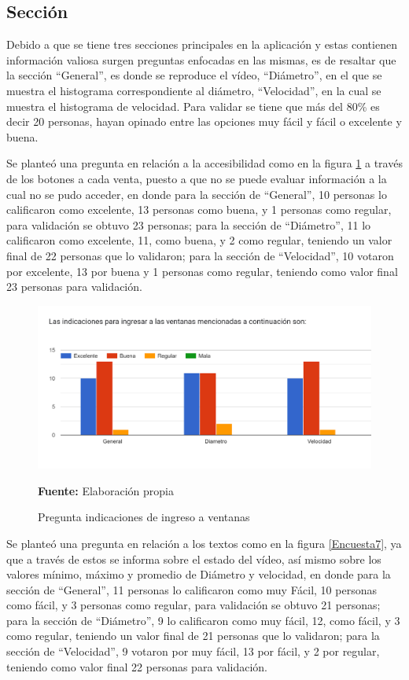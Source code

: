 \documentclass[12pt,twocolumn,a4paper]{article}
\begin{document}
\subsection{Sección}

Debido a que se tiene tres secciones principales en la aplicación y estas contienen información valiosa surgen preguntas enfocadas en las mismas, es de resaltar que la sección “General”, es  donde se reproduce el vídeo, “Diámetro”, en el que se muestra el histograma correspondiente al diámetro, “Velocidad”, en la cual se muestra el histograma de velocidad. Para validar se tiene que más del 80\%  es decir 20 personas, hayan opinado entre las opciones muy fácil y fácil o excelente y buena.

Se planteó una pregunta en relación a la accesibilidad como en la figura \ref{Encuesta6} a través de los botones a cada venta, puesto a que no se puede evaluar información a la cual no se pudo acceder, en donde para la sección de “General”, 10 personas lo calificaron como excelente, 13 personas como buena, y 1 personas como regular, para validación se obtuvo 23 personas; para la sección de “Diámetro”, 11 lo calificaron como excelente, 11, como  buena, y 2 como regular, teniendo un valor final de 22 personas que lo validaron; para la sección de “Velocidad”, 10 votaron por excelente, 13 por  buena y 1 personas como regular, teniendo como valor final 23 personas para validación.

\begin{figure}[h!]
	\centering
	\includegraphics[scale=0.2]{Encuesta6.png}
	\caption{Pregunta indicaciones de ingreso a ventanas} \textbf{Fuente:} Elaboración propia
	\label{Encuesta6}
\end{figure}

Se planteó una pregunta en relación a los textos como en la figura \ref{Encuesta7}, ya que a través de estos se informa sobre el estado del vídeo, así mismo sobre los valores mínimo, máximo y promedio de Diámetro y velocidad, en donde para la sección de “General”, 11 personas lo calificaron como muy Fácil, 10 personas como fácil, y 3 personas como regular, para validación se obtuvo 21 personas; para la sección de “Diámetro”, 9 lo calificaron como muy fácil, 12, como fácil, y 3 como regular, teniendo un valor final de 21 personas que lo validaron; para la sección de “Velocidad”, 9 votaron por muy fácil, 13 por fácil, y 2 por regular, teniendo como valor final 22 personas para validación. 
\end{document}

